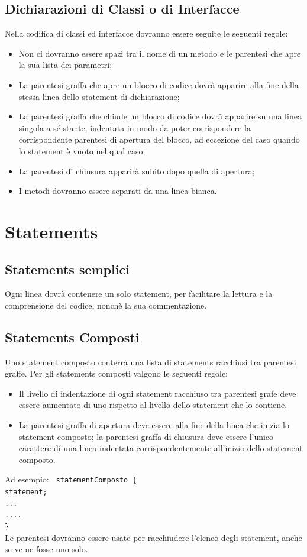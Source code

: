 \documentclass[11pt,titlepage,a4paper]{report}
\begin{document}
\subsection{Dichiarazioni di Classi o di Interfacce}
Nella codifica di classi ed interfacce dovranno essere seguite le seguenti regole:
\begin{itemize}
\item Non ci dovranno essere spazi tra il nome di un metodo e le parentesi che apre la sua lista dei parametri;
\item La parentesi graffa che apre un blocco di codice dovr\`a apparire alla fine della stessa linea dello statement di dichiarazione;
\item La parentesi graffa che chiude un blocco di codice dovr\`a apparire su una linea singola a sé stante, indentata in modo da poter corrispondere la corrispondente parentesi di apertura del blocco, ad eccezione del caso quando lo statement è vuoto nel qual caso;
\item La parentesi di chiusura apparir\`a subito dopo quella di apertura;
\item I metodi dovranno essere separati da una linea bianca.
\end{itemize}

\section{Statements}
\subsection{Statements semplici}
Ogni linea dovr\`a contenere un solo statement, per facilitare la lettura e la comprensione del codice, nonch\`e la sua commentazione.
\subsection{Statements Composti}
Uno statement composto conterr\`a una lista di statements racchiusi tra parentesi graffe. Per gli statements composti valgono le seguenti regole:
\begin{itemize}
\item Il livello di indentazione di ogni statement racchiuso tra parentesi grafe deve essere aumentato di uno rispetto al livello dello statement che lo contiene.
\item La parentesi graffa di apertura deve essere alla fine della linea che inizia lo statement composto; la parentesi graffa di chiusura deve essere l'unico carattere di una linea indentata corrispondentemente all'inizio dello statement composto.\newline
\end{itemize}
Ad esempio:\newline
	\newline
	\texttt{
	statementComposto \{ \\
	\phantom{....}statement;\\
	\phantom{....}... \\
	\phantom{....}.... \\
	\}
} \\
 \newline
Le parentesi dovranno essere usate per racchiudere l'elenco degli statement, anche se ve ne fosse uno solo.
\end{document}
